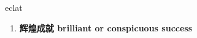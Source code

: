 
\begin{frame}
{\huge eclat}
\begin{center}
\begin{enumerate}\Large
  \item \textbf{辉煌成就 brilliant or conspicuous success}
\end{enumerate}
\end{center}
\end{frame}
